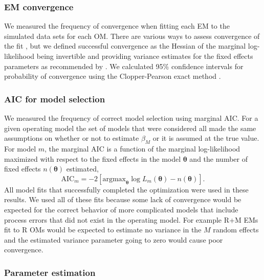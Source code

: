 \documentclass[
  12pt,
]{article}
\begin{document}
\hypertarget{em-convergence}{%
\subsubsection*{EM convergence}\label{em-convergence}}

We measured the frequency of convergence when fitting each EM to the simulated data sets for each OM. There are various ways to assess convergence of the fit \citep[e.g.,][]{carvalhoetal21}, but we defined successful convergence as the Hessian of the marginal log-likelihood being invertible and providing variance estimates for the fixed effects parameters as recommended by \citet{milleretal_inreview1}. We calculated 95\% confidence intervals for probability of convergence using the Clopper-Pearson exact method \citep{clopperpearson34, thulin14}.

\hypertarget{aic-for-model-selection}{%
\subsubsection*{AIC for model selection}\label{aic-for-model-selection}}

We measured the frequency of correct model selection using marginal AIC. For a given operating model the set of models that were considered all made the same assumptions on whether or not to estimate \(\beta_M\) or it is assumed at the true value. For model \(m\), the marginal AIC is a function of the marginal log-likelihood maximized with respect to the fixed effects in the model \(\boldsymbol{\theta}\) and the number of fixed effects \(n\left(\boldsymbol{\theta}\right)\) estimated,
\[
\text{AIC}_m = -2\left[{\text{argmax}}_{\boldsymbol{\theta}} \log L_m\left({\boldsymbol{\theta}}\right) - n\left({\boldsymbol{\theta}}\right)\right].
\]
All model fits that successfully completed the optimization were used in these results. We used all of these fits because some lack of convergence would be expected for the correct behavior of more complicated models that include process errors that did not exist in the operating model. For example R+M EMs fit to R OMs would be expected to estimate no variance in the \(M\) random effects and the estimated variance parameter going to zero would cause poor convergence.

\hypertarget{parameter-estimation}{%
\subsubsection*{Parameter estimation}\label{parameter-estimation}}
\end{document}
